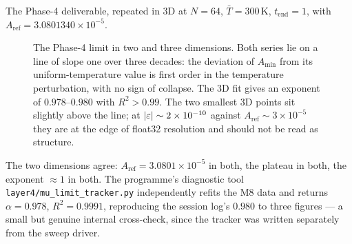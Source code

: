 The Phase-4 deliverable, repeated in 3D at \(N=64\),
\(\bar T=300\,\mathrm{K}\), \(t_{\mathrm{end}}=1\), with
\(A_{\mathrm{ref}}=3.0801340\times10^{-5}\).

\begin{figure}[ht]
\centering
{}
\caption[The Prize limit is regular in both dimensions]{The Phase-4 limit in
two and three dimensions. Both series lie on a line of slope one over three
decades: the deviation of \(A_{\min}\) from its uniform-temperature value is
first order in the temperature perturbation, with no sign of collapse. The
3D fit gives an exponent of \(0.978\)--\(0.980\) with \(R^2>0.99\). The two
smallest 3D points sit slightly above the line; at \(\left|\varepsilon\right|\sim
2\times10^{-10}\) against \(A_{\mathrm{ref}}\sim3\times10^{-5}\) they are at
the edge of float32 resolution and should not be read as structure.}
\label{fig:mu-limit-2d3d}
\end{figure}

The two dimensions agree: \(A_{\mathrm{ref}}=3.0801\times10^{-5}\) in both,
the plateau in both, the exponent \(\approx1\) in both. The programme's
diagnostic tool \texttt{layer4/mu\_limit\_tracker.py} independently refits the
M8 data and returns \(\alpha=0.978\), \(R^2=0.9991\), reproducing the session
log's \(0.980\) to three figures --- a small but genuine internal
cross-check, since the tracker was written separately from the sweep driver.

